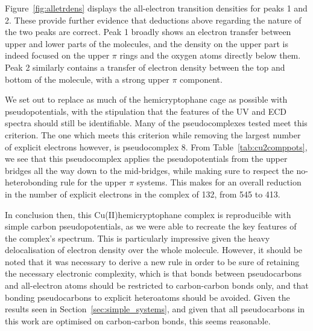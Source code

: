 \documentclass[aip,reprint,nofootinbib]{revtex4-1}
\begin{document}
Figure~\ref{fig:alletrdens} displays the all-electron transition densities for peaks 1 and 2. These provide further evidence that deductions above regarding the nature of the two peaks are correct. Peak 1 broadly shows an electron transfer between upper and lower parts of the molecules, and the density on the upper part is indeed focused on the upper $\pi$ rings and the oxygen atoms directly below them. Peak 2 similarly contains a transfer of electron density between the top and bottom of the molecule, with a strong upper $\pi$ component.

We set out to replace as much of the hemicryptophane cage as possible with pseudopotentials, with the stipulation that the features of the UV and ECD spectra should still be identifiable. Many of the pseudocomplexes tested meet this criterion. The one which meets this criterion while removing the largest number of explicit electrons however, is pseudocomplex 8. From Table~\ref{tab:cu2comppots}, we see that this pseudocomplex applies the pseudopotentials from the upper bridges all the way down to the mid-bridges, while making sure to respect the no-heterobonding rule for the upper $\pi$ systems. This makes for an overall reduction in the number of explicit electrons in the complex of 132, from 545 to 413.

In conclusion then, this Cu(II)hemicryptophane complex is reproducible with simple carbon pseudopotentials, as we were able to recreate the key features of the complex's spectrum. This is particularly impressive given the heavy delocalisation of electron density over the whole molecule. However, it should be noted that it was necessary to derive a new rule in order to be sure of retaining the necessary electronic complexity, which is that bonds between pseudocarbons and all-electron atoms should be restricted to carbon-carbon bonds only, and that bonding pseudocarbons to explicit heteroatoms should be avoided. Given the results seen in Section~\ref{sec:simple_systems}, and given that all pseudocarbons in this work are optimised on carbon-carbon bonds, this seems reasonable.
\end{document}
